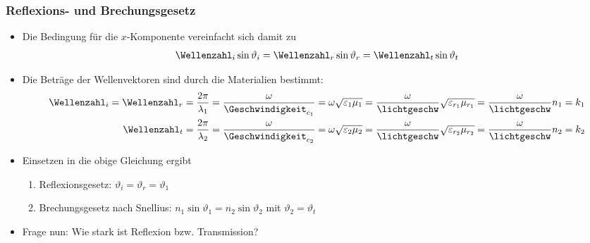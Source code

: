 \begin{frame}
  \frametitle{Reflexions- und Brechungsgesetz}
  \begin{itemize}[<+->]
  \item Die Bedingung für die \(x\)-Komponente vereinfacht sich damit zu
    \begin{equation*}
      \Wellenzahl_i\sin\vartheta_i = \Wellenzahl_r\sin\vartheta_r =\Wellenzahl_t\sin\vartheta_t
    \end{equation*}
  \item Die Beträge der Wellenvektoren sind durch die Materialien bestimmt:
    \begin{align*}
      \Wellenzahl_i = \Wellenzahl_r &= \frac{2\pi}{\lambda_1} = \frac{\omega}{\Geschwindigkeit_{c_1}} = \omega\sqrt{\varepsilon_1\mu_1} = \frac{\omega}{\lichtgeschw}\sqrt{\varepsilon_{r_1}\mu_{r_1}} = \frac{\omega}{\lichtgeschw} n_1 = k_1\\ 
      \Wellenzahl_t &= \frac{2\pi}{\lambda_2} = \frac{\omega}{\Geschwindigkeit_{c_2}} = \omega\sqrt{\varepsilon_2\mu_2} = \frac{\omega}{\lichtgeschw}\sqrt{\varepsilon_{r_2}\mu_{r_2}} = \frac{\omega}{\lichtgeschw} n_2 = k_2
    \end{align*}
  \item Einsetzen in die obige Gleichung ergibt
    \begin{enumerate}[<+->]
    \item Reflexionsgesetz: \(\boxed{\vartheta_i=\vartheta_r}=\vartheta_1\)
      \item Brechungsgesetz nach Snellius: \(\boxed{ n_1\sin\vartheta_1 = n_2\sin\vartheta_2}\) mit \(\vartheta_2=\vartheta_t\)
      \end{enumerate}
      \item Frage nun: Wie stark ist Reflexion bzw. Transmission?
  \end{itemize}
\end{frame}



